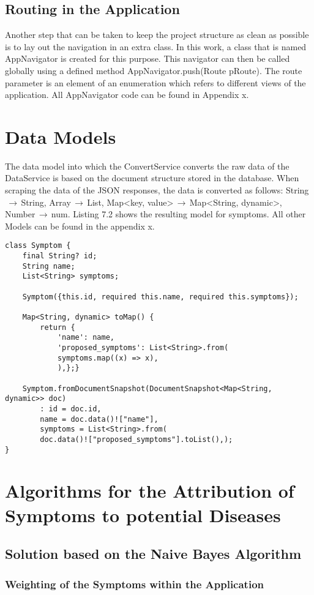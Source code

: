 \subsection{Routing in the Application}
Another step that can be taken to keep the project structure as clean as possible is to lay out the navigation in an extra class. In this work, a class that is named AppNavigator is created for this purpose. This navigator can then be called globally using a defined method AppNavigator.push(Route pRoute). The route parameter is an element of an enumeration which refers to different views of the application. All AppNavigator code can be found in Appendix x.
\section{Data Models}
The data model into which the ConvertService converts the raw data of the DataService is based on the document structure stored in the database. When scraping the data of the JSON responses, the data is converted as follows: String$\,\to\,$String, Array$\,\to\,$List, Map<key, value>$\,\to\,$Map<String, dynamic>, Number$\,\to\,$num. Listing 7.2 shows the resulting model for symptoms. All other Models can be found in the appendix x.
\scriptsize
\begin{lstlisting}[caption=Model for Symptoms]
class Symptom {
	final String? id;
	String name;
	List<String> symptoms;
	
	Symptom({this.id, required this.name, required this.symptoms});
	
	Map<String, dynamic> toMap() {
		return {
			'name': name,
			'proposed_symptoms': List<String>.from(
			symptoms.map((x) => x),
			),};}
	
	Symptom.fromDocumentSnapshot(DocumentSnapshot<Map<String, dynamic>> doc)
		: id = doc.id,
		name = doc.data()!["name"],
		symptoms = List<String>.from(
		doc.data()!["proposed_symptoms"].toList(),);	
}
\end{lstlisting}
\normalsize


\section{Algorithms for the Attribution of Symptoms to potential Diseases}
\subsection{Solution based on the Naive Bayes Algorithm}
\subsubsection{Weighting of the Symptoms within the Application}
